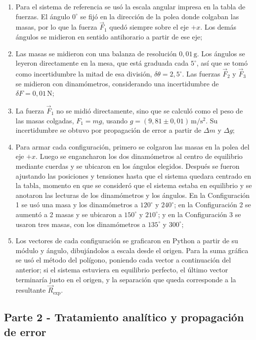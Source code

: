 \documentclass[12pt,a4paper]{article}
\begin{document}
\begin{enumerate}[label=\alph*)]
\item Para el sistema de referencia se usó la escala angular impresa en la tabla de fuerzas. El ángulo $0^\circ$ se fijó en la dirección de la polea donde colgaban las masas, por lo que la fuerza $\vec{F}_1$ quedó siempre sobre el eje $+x$. Los demás ángulos se midieron en sentido antihorario a partir de ese eje;
\item Las masas se midieron con una balanza de resolución $0{,}01\,\mathrm{g}$. Los ángulos se leyeron directamente en la mesa, que está graduada cada $5^\circ$, así que se tomó como incertidumbre la mitad de esa división, $\delta\theta = 2{,}5^\circ$. Las fuerzas $\vec{F}_2$ y $\vec{F}_3$ se midieron con dinamómetros, considerando una incertidumbre de $\delta F = 0{,}01\,\mathrm{N}$;
\item La fuerza $\vec{F}_1$ no se midió directamente, sino que se calculó como el peso de las masas colgadas, $F_1 = mg$, usando $g = (9{,}81 \pm 0{,}01)\,\mathrm{m/s^2}$. Su incertidumbre se obtuvo por propagación de error a partir de $\Delta m$ y $\Delta g$;
\item Para armar cada configuración, primero se colgaron las masas en la polea del eje $+x$. Luego se engancharon los dos dinamómetros al centro de equilibrio mediante cuerdas y se ubicaron en los ángulos elegidos. Después se fueron ajustando las posiciones y tensiones hasta que el sistema quedara centrado en la tabla, momento en que se consideró que el sistema estaba en equilibrio y se anotaron las lecturas de los dinamómetros y los ángulos. En la Configuración 1 se usó una masa y los dinamómetros a $120^\circ$ y $240^\circ$; en la Configuración 2 se aumentó a 2 masas y se ubicaron a $150^\circ$ y $210^\circ$; y en la Configuración 3 se usaron tres masas, con los dinamómetros a $135^\circ$ y $300^\circ$;
\item Los vectores de cada configuración se graficaron en Python a partir de su módulo y ángulo, dibujándolos a escala desde el origen. Para la suma gráfica se usó el método del polígono, poniendo cada vector a continuación del anterior; si el sistema estuviera en equilibrio perfecto, el último vector terminaría justo en el origen, y la separación que queda corresponde a la resultante $\vec{R}_{\mathrm{exp}}$.
\end{enumerate}

\subsection{Parte 2 - Tratamiento analítico y propagación de error} \label{Procedimiento-Parte-2}
\end{document}
